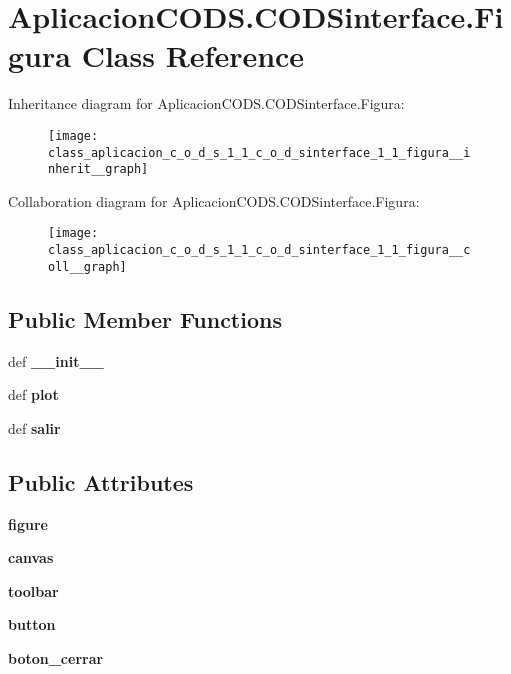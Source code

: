 \section{\-Aplicacion\-C\-O\-D\-S.\-C\-O\-D\-Sinterface.\-Figura \-Class \-Reference}
\label{class_aplicacion_c_o_d_s_1_1_c_o_d_sinterface_1_1_figura}


\-Inheritance diagram for \-Aplicacion\-C\-O\-D\-S.\-C\-O\-D\-Sinterface.\-Figura\-:\nopagebreak
\begin{figure}[H]
\begin{center}
\leavevmode
\texttt{[image: class\_aplicacion\_c\_o\_d\_s\_1\_1\_c\_o\_d\_sinterface\_1\_1\_figura\_\_inherit\_\_graph]}
\end{center}
\end{figure}


\-Collaboration diagram for \-Aplicacion\-C\-O\-D\-S.\-C\-O\-D\-Sinterface.\-Figura\-:\nopagebreak
\begin{figure}[H]
\begin{center}
\leavevmode
\texttt{[image: class\_aplicacion\_c\_o\_d\_s\_1\_1\_c\_o\_d\_sinterface\_1\_1\_figura\_\_coll\_\_graph]}
\end{center}
\end{figure}
\subsection*{\-Public \-Member \-Functions}
\begin{DoxyCompactItemize}
\item 
def {\bf \-\_\-\-\_\-init\-\_\-\-\_\-}
\item 
def {\bf plot}
\item 
def {\bf salir}
\end{DoxyCompactItemize}
\subsection*{\-Public \-Attributes}
\begin{DoxyCompactItemize}
\item 
{\bf figure}
\item 
{\bf canvas}
\item 
{\bf toolbar}
\item 
{\bf button}
\item 
{\bf boton\-\_\-cerrar}
\end{DoxyCompactItemize}


